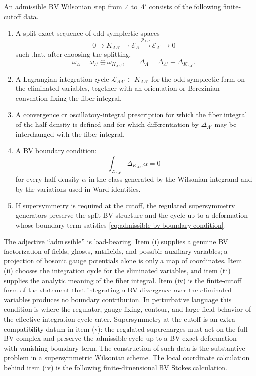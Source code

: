 \begin{definition}
\label{def:admissible-bv-wilsonian-step}
An admissible BV Wilsonian step from \(\Lambda\) to \(\Lambda'\) consists of
the following finite-cutoff data.

\begin{enumerate}[label=(\roman*)]
\item A split exact sequence of odd symplectic spaces
\[
  0\longrightarrow K_{\Lambda\Lambda'}
  \longrightarrow \mathcal E_\Lambda
  \overset{p_{\Lambda\Lambda'}}{\longrightarrow}
  \mathcal E_{\Lambda'}
  \longrightarrow 0
\]
such that, after choosing the splitting,
\[
  \omega_\Lambda=\omega_{\Lambda'}\oplus\omega_{K_{\Lambda\Lambda'}},
  \qquad
  \Delta_\Lambda=\Delta_{\Lambda'}+\Delta_{K_{\Lambda\Lambda'}} .
\]
\item A Lagrangian integration cycle
\(\mathcal L_{\Lambda\Lambda'}\subset K_{\Lambda\Lambda'}\) for the odd
symplectic form on the eliminated variables, together with an orientation
or Berezinian convention fixing the fiber integral.
\item A convergence or oscillatory-integral prescription for which the fiber
integral of the half-density is defined and for which differentiation by
\(\Delta_{\Lambda'}\) may be interchanged with the fiber integral.
\item A BV boundary condition:
\begin{equation}
  \int_{\mathcal L_{\Lambda\Lambda'}}
  \Delta_{K_{\Lambda\Lambda'}}\alpha=0
  \label{eq:admissible-bv-boundary-condition}
\end{equation}
for every half-density \(\alpha\) in the class generated by the Wilsonian
integrand and by the variations used in Ward identities.
\item If supersymmetry is required at the cutoff, the regulated
supersymmetry generators preserve the split BV structure and the cycle
up to a deformation whose boundary term satisfies
\eqref{eq:admissible-bv-boundary-condition}.
\end{enumerate}
\end{definition}

The adjective ``admissible'' is load-bearing.  Item (i) supplies a genuine BV
factorization of fields, ghosts, antifields, and possible auxiliary variables;
a projection of bosonic gauge potentials alone is only a map of coordinates.
Item (ii) chooses the integration cycle for the eliminated variables, and
item (iii) supplies the analytic meaning of the fiber integral.  Item (iv) is
the finite-cutoff form of the statement that integrating a BV divergence over
the eliminated variables produces no boundary contribution.  In perturbative
language this condition is where the regulator, gauge fixing, contour, and
large-field behavior of the effective integration cycle enter.  Supersymmetry
at the cutoff is an extra compatibility datum in item (v): the regulated
supercharges must act on the full BV complex and preserve the admissible cycle
up to a BV-exact deformation with vanishing boundary term.  The construction of
such data is the substantive problem in a supersymmetric Wilsonian scheme.
The local coordinate calculation behind item (iv) is the following
finite-dimensional BV Stokes calculation.

